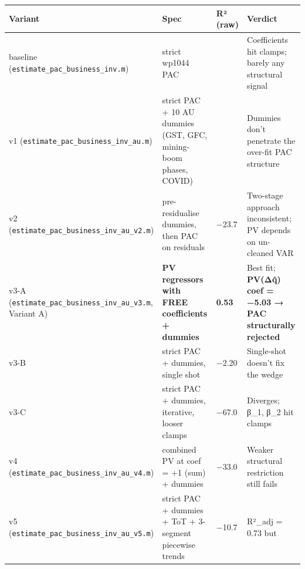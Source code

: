 \documentclass[
]{article}
\newcounter{none} %
\begin{document}
{\def\LTcaptype{none} %
\begin{longtable}[]{@{}
  >{\raggedright\arraybackslash}p{}
  >{\raggedright\arraybackslash}p{}
  >{\raggedright\arraybackslash}p{}
  >{\raggedright\arraybackslash}p{}@{}}
\toprule\noalign{}
\begin{minipage}[b]{\linewidth}\raggedright
Variant
\end{minipage} & \begin{minipage}[b]{\linewidth}\raggedright
Spec
\end{minipage} & \begin{minipage}[b]{\linewidth}\raggedright
R² (raw)
\end{minipage} & \begin{minipage}[b]{\linewidth}\raggedright
Verdict
\end{minipage} \\
\midrule\noalign{}
\endhead
\bottomrule\noalign{}
\endlastfoot
baseline (\texttt{estimate\_pac\_business\_inv.m}) & strict wp1044 PAC &
0.09 & Coefficients hit clamps; barely any structural signal \\
v1 (\texttt{estimate\_pac\_business\_inv\_au.m}) & strict PAC + 10 AU
dummies (GST, GFC, mining-boom phases, COVID) & 0.11 & Dummies don't
penetrate the over-fit PAC structure \\
v2 (\texttt{estimate\_pac\_business\_inv\_au\_v2.m}) & pre-residualise
dummies, then PAC on residuals & −23.7 & Two-stage approach
inconsistent; PV depends on un-cleaned VAR \\
v3-A (\texttt{estimate\_pac\_business\_inv\_au\_v3.m}, Variant A) &
\textbf{PV regressors with FREE coefficients + dummies} & \textbf{0.53}
& Best fit; \textbf{PV(Δq̂) coef = −5.03 → PAC structurally rejected} \\
v3-B & strict PAC + dummies, single shot & −2.20 & Single-shot doesn't
fix the wedge \\
v3-C & strict PAC + dummies, iterative, looser clamps & −67.0 &
Diverges; β\_1, β\_2 hit clamps \\
v4 (\texttt{estimate\_pac\_business\_inv\_au\_v4.m}) & combined PV at
coef = +1 (sum) + dummies & −33.0 & Weaker structural restriction still
fails \\
v5 (\texttt{estimate\_pac\_business\_inv\_au\_v5.m}) & strict PAC +
dummies + ToT + 3-segment piecewise trends & −10.7 & R²\_adj = 0.73 but

\end{longtable}}
\end{document}
